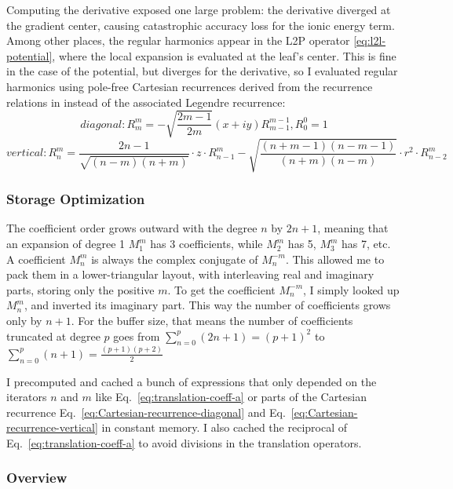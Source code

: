 Computing the derivative exposed one large problem: the derivative diverged at the gradient center, causing catastrophic accuracy loss for the ionic energy term.
Among other places, the regular harmonics appear in the L2P operator \ref{eq:l2l-potential}, where the local expansion is evaluated at the leaf's center.
This is fine in the case of the potential, but diverges for the derivative, so I evaluated regular harmonics using pole-free Cartesian recurrences derived from the recurrence relations in \cite{perezjorda1996solidharmonics} instead of the associated Legendre recurrence:
\begin{equation}
    diagonal: R_m^m = -\sqrt{\frac{2m-1}{2m}} (x+iy) R_{m-1}^{m-1},   R_0^0 = 1
    \label{eq:Cartesian-recurrence-diagonal}
\end{equation}
\begin{equation}
    vertical: R_n^m = \frac{2n-1}{\sqrt{(n-m)(n+m)}} \cdot z \cdot R_{n-1}^m - \sqrt{\frac{(n+m-1)(n-m-1)}{(n+m)(n-m)}} \cdot r^2 \cdot R_{n-2}^m
    \label{eq:Cartesian-recurrence-vertical}
\end{equation}

\subsubsection{Storage Optimization}

The coefficient order grows outward with the degree $n$ by $2n+1$, meaning that an expansion of degree 1 $M_1^m$ has 3 coefficients, while $M_2^m$ has 5, $M_3^m$ has 7, etc.
A coefficient $M_n^m$ is always the complex conjugate of $M_n^{-m}$.
This allowed me to pack them in a lower-triangular layout, with interleaving real and imaginary parts, storing only the positive $m$.
To get the coefficient $M_n^{-m}$, I simply looked up $M_n^m$, and inverted its imaginary part.
This way the number of coefficients grows only by $n+1$.
For the buffer size, that means the number of coefficients truncated at degree $p$ goes from $\sum_{n=0}^{p}(2n+1) = (p+1)^2$ to $\sum_{n=0}^{p}(n+1) = \frac{(p+1)(p+2)}{2}$

I precomputed and cached a bunch of expressions that only depended on the iterators $n$ and $m$ like Eq.~\eqref{eq:translation-coeff-a} or parts of the Cartesian recurrence Eq.~\eqref{eq:Cartesian-recurrence-diagonal} and Eq.~\eqref{eq:Cartesian-recurrence-vertical} in constant memory.
I also cached the reciprocal of Eq.~\eqref{eq:translation-coeff-a} to avoid divisions in the translation operators.

\subsubsection{Overview}

